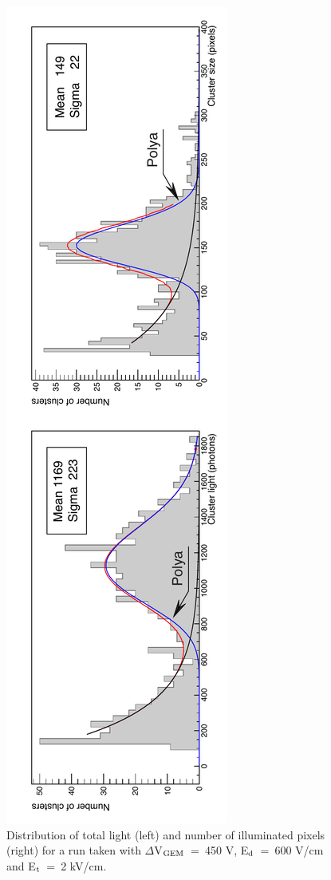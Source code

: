\documentclass[a4paper]{jpconf}
\begin{document}
\begin{figure}[htbp]
\centering
\includegraphics[width=.27\textwidth, angle=270]{hq_s_Xray_run823.pdf}
\caption{Distribution of total light (left) and number of illuminated
  pixels (right) for a run taken with $\Delta$V$_{\rm GEM}$~=~450 V,
  E$_{\rm d}$~=~600 V/cm and E$_{\rm t}$~=~2 kV/cm.}
\label{fig:spectra}
\end{figure}
\end{document}

